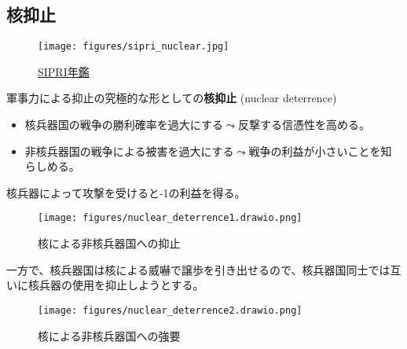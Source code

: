 \documentclass[
  xelatex,
  ja=standard]{bxjsarticle}
\providecommand{\tightlist}{%
  \setlength{\itemsep}{0pt}\setlength{\parskip}{0pt}}\usepackage{longtable,booktabs,array}
\begin{document}
\hypertarget{ux6838ux6291ux6b62}{%
\subsection{核抑止}\label{ux6838ux6291ux6b62}}

\begin{figure}[htpb]

{\centering \texttt{[image: figures/sipri\_nuclear.jpg]}

}

\caption{\href{https://www.sipri.org/yearbook/2022/10}{SIPRI年鑑}}

\end{figure}

軍事力による抑止の究極的な形としての\textbf{核抑止} (nuclear deterrence)

\begin{itemize}
\tightlist
\item
  核兵器国の戦争の勝利確率を過大にする\(\leadsto\)反撃する信憑性を高める。
\item
  非核兵器国の戦争による被害を過大にする\(\leadsto\)戦争の利益が小さいことを知らしめる。
\end{itemize}

\begin{tcolorbox}[enhanced jigsaw, left=2mm, coltitle=black, bottomtitle=1mm, colback=white, titlerule=0mm, breakable, leftrule=.75mm, opacitybacktitle=0.6, rightrule=.15mm, colbacktitle=quarto-callout-tip-color!10!white, arc=.35mm, colframe=quarto-callout-tip-color-frame, title=\textcolor{quarto-callout-tip-color}{\faLightbulb}\hspace{0.5em}{核による非核兵器国への抑止}, toptitle=1mm, toprule=.15mm, bottomrule=.15mm, opacityback=0]

核兵器によって攻撃を受けると-1の利益を得る。

\end{tcolorbox}

\begin{figure}[htpb]

{\centering \texttt{[image: figures/nuclear\_deterrence1.drawio.png]}

}

\caption{核による非核兵器国への抑止}

\end{figure}

一方で、核兵器国は核による威嚇で譲歩を引き出せるので、核兵器国同士では互いに核兵器の使用を抑止しようとする。

\begin{figure}[htpb]

{\centering \texttt{[image: figures/nuclear\_deterrence2.drawio.png]}

}

\caption{核による非核兵器国への強要}

\end{figure}
\end{document}
